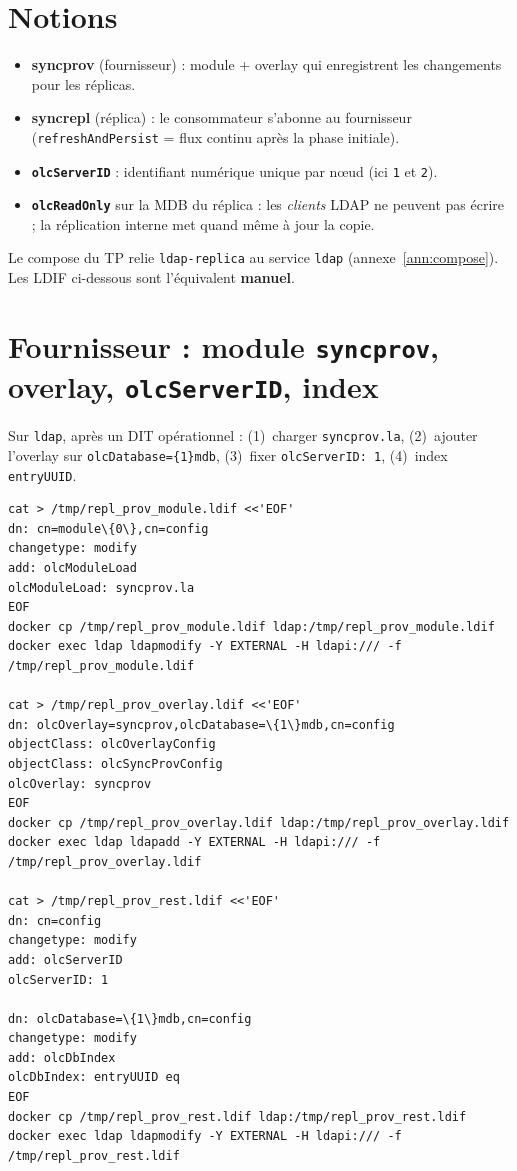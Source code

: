 \documentclass[11pt,a4paper]{report}
\begin{document}
\section{Notions}

\begin{itemize}[leftmargin=*]
  \item \textbf{syncprov} (fournisseur) : module + overlay qui enregistrent les changements pour les réplicas.
  \item \textbf{syncrepl} (réplica) : le consommateur s'abonne au fournisseur (\texttt{refreshAndPersist} = flux continu après la phase initiale).
  \item \textbf{\texttt{olcServerID}} : identifiant numérique unique par nœud (ici \texttt{1} et \texttt{2}).
  \item \textbf{\texttt{olcReadOnly}} sur la MDB du réplica : les \emph{clients} LDAP ne peuvent pas écrire ; la réplication interne met quand même à jour la copie.
\end{itemize}

Le compose du TP relie \texttt{ldap-replica} au service \texttt{ldap} (annexe~\ref{ann:compose}). Les LDIF ci-dessous sont l'équivalent \textbf{manuel}.

\section{Fournisseur : module \texttt{syncprov}, overlay, \texttt{olcServerID}, index}

Sur \texttt{ldap}, après un DIT opérationnel : (1)~charger \texttt{syncprov.la}, (2)~ajouter l'overlay sur \texttt{olcDatabase=\{1\}mdb}, (3)~fixer \texttt{olcServerID: 1}, (4)~index \texttt{entryUUID}.

\begin{lstlisting}[style=bashstyle]
cat > /tmp/repl_prov_module.ldif <<'EOF'
dn: cn=module\{0\},cn=config
changetype: modify
add: olcModuleLoad
olcModuleLoad: syncprov.la
EOF
docker cp /tmp/repl_prov_module.ldif ldap:/tmp/repl_prov_module.ldif
docker exec ldap ldapmodify -Y EXTERNAL -H ldapi:/// -f /tmp/repl_prov_module.ldif

cat > /tmp/repl_prov_overlay.ldif <<'EOF'
dn: olcOverlay=syncprov,olcDatabase=\{1\}mdb,cn=config
objectClass: olcOverlayConfig
objectClass: olcSyncProvConfig
olcOverlay: syncprov
EOF
docker cp /tmp/repl_prov_overlay.ldif ldap:/tmp/repl_prov_overlay.ldif
docker exec ldap ldapadd -Y EXTERNAL -H ldapi:/// -f /tmp/repl_prov_overlay.ldif

cat > /tmp/repl_prov_rest.ldif <<'EOF'
dn: cn=config
changetype: modify
add: olcServerID
olcServerID: 1

dn: olcDatabase=\{1\}mdb,cn=config
changetype: modify
add: olcDbIndex
olcDbIndex: entryUUID eq
EOF
docker cp /tmp/repl_prov_rest.ldif ldap:/tmp/repl_prov_rest.ldif
docker exec ldap ldapmodify -Y EXTERNAL -H ldapi:/// -f /tmp/repl_prov_rest.ldif
\end{lstlisting}
\end{document}
